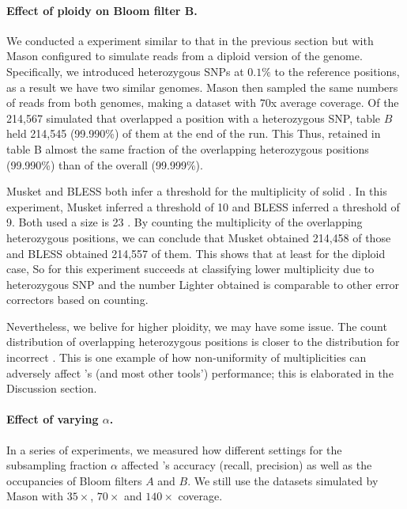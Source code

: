 \documentclass{bmcart}
\begin{document}
\paragraph{Effect of ploidy on Bloom filter B.}  We conducted a experiment similar to that in the previous section but with Mason configured to simulate reads from a diploid version of the \ecoli genome.
Specifically, we introduced heterozygous SNPs at $0.1\%$ to the reference positions, as a result we have two similar genomes.
Mason then sampled the same numbers of reads from both genomes, making a dataset with $70$x average coverage.
Of the 214,567 simulated \kmers that overlapped a position with a heterozygous SNP, table $B$ held 214,545 (99.990\%) of them at the end of the run. This
Thus, \tool retained in table B almost the same fraction of the \kmers overlapping heterozygous positions (99.990\%) than of the \kmers overall (99.999\%).

Musket and BLESS both infer a threshold for the multiplicity of solid \kmers. In this experiment, Musket inferred a threshold of 10 and BLESS inferred a threshold of 9.
Both used a \kmer size is 23 .
By counting the multiplicity of the \kmers overlapping heterozygous positions, we can conclude that Musket obtained 214,458 of those \kmers and BLESS obtained 214,557 of them. This shows that at least for the diploid case,
So for this experiment \tool succeeds at classifying lower multiplicity due to heterozygous SNP and the number Lighter obtained is comparable to other error correctors based on counting.

Nevertheless, we belive for higher ploidity, we may have some issue. 
The count distribution of \kmers overlapping heterozygous positions is closer to the distribution for incorrect \kmers.
This is one example of how non-uniformity of \kmer multiplicities can adversely affect \tool's (and most other tools') performance; this is elaborated in the Discussion section.


\paragraph{Effect of varying $\alpha$.} In a series of experiments, we measured how different settings for the subsampling fraction $\alpha$ affected \tool's accuracy (recall, precision) as well as the occupancies of Bloom filters $A$ and $B$.  We still use the datasets simulated by Mason with $35\times$, $70\times$ and $140\times$ coverage. 
\end{document}

